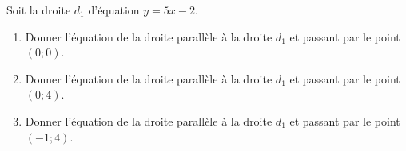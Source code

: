 
\begin{exercice}\label{exosmath-0684}

    Soit la droite \( d_1\) d'équation \( y=5x-2\).
    \begin{enumerate}
        \item
            Donner l'équation de la droite parallèle à la droite \( d_1\) et passant par le point \( (0;0)\). 
        \item
            Donner l'équation de la droite parallèle à la droite \( d_1\) et passant par le point \( (0;4)\). 
        \item
            Donner l'équation de la droite parallèle à la droite \( d_1\) et passant par le point \( (-1;4)\). 
    \end{enumerate}

\end{exercice}
